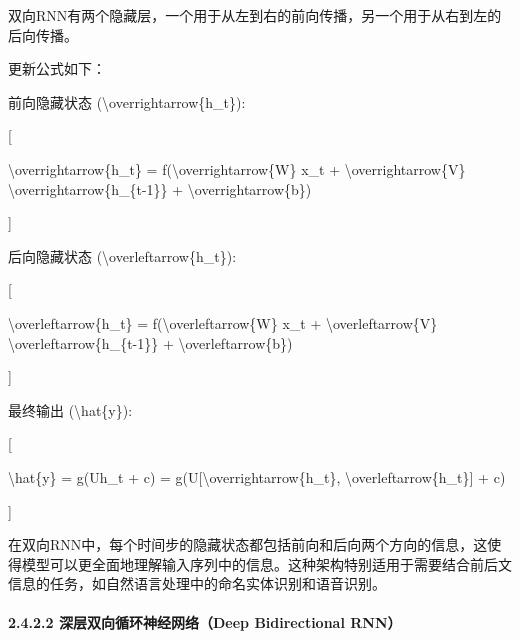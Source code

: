 双向RNN有两个隐藏层，一个用于从左到右的前向传播，另一个用于从右到左的后向传播。

更新公式如下：

前向隐藏状态 (\textbackslash overrightarrow\{h\_t\}):

{[}

\textbackslash overrightarrow\{h\_t\} =
f(\textbackslash overrightarrow\{W\} x\_t +
\textbackslash overrightarrow\{V\}
\textbackslash overrightarrow\{h\_\{t-1\}\} +
\textbackslash overrightarrow\{b\})

{]}


后向隐藏状态 (\textbackslash overleftarrow\{h\_t\}):

{[}

\textbackslash overleftarrow\{h\_t\} =
f(\textbackslash overleftarrow\{W\} x\_t +
\textbackslash overleftarrow\{V\}
\textbackslash overleftarrow\{h\_\{t-1\}\} +
\textbackslash overleftarrow\{b\})

{]}


最终输出 (\textbackslash hat\{y\}):

{[}

\textbackslash hat\{y\} = g(Uh\_t + c) =
g(U{[}\textbackslash overrightarrow\{h\_t\},
\textbackslash overleftarrow\{h\_t\}{]} + c)

{]}


在双向RNN中，每个时间步的隐藏状态都包括前向和后向两个方向的信息，这使得模型可以更全面地理解输入序列中的信息。这种架构特别适用于需要结合前后文信息的任务，如自然语言处理中的命名实体识别和语音识别。

\paragraph{\texorpdfstring{\textbf{2.4.2.2}
\textbf{深层双向循环神经网络（Deep Bidirectional
RNN）}}{2.4.2.2 深层双向循环神经网络（Deep Bidirectional RNN）}}\label{2422-ux6df1ux5c42ux53ccux5411ux5faaux73afux795eux7ecfux7f51ux7edcdeep-bidirectional-rnn}

